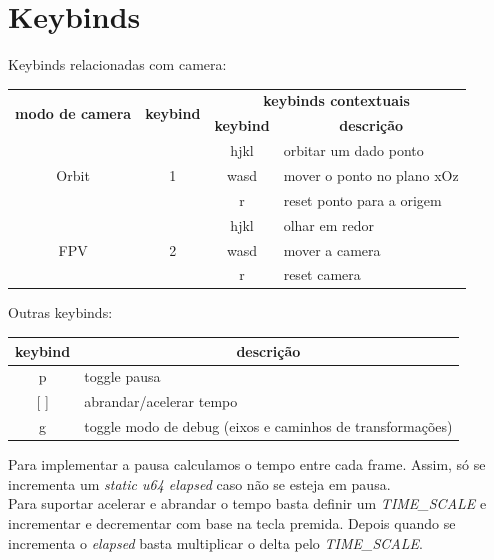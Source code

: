 \documentclass[a4paper]{report}
\begin{document}
\section{Keybinds}
Keybinds relacionadas com camera:
\begin{table}[H]
\begin{tabular}{|c|c|c|l|}
\hline
\multirow{2}{*}{\textbf{modo de camera}} & \multirow{2}{*}{\textbf{keybind}} & \multicolumn{2}{c|}{\textbf{keybinds contextuais}} \\ \cline{3-4} 
                       &                    & \textbf{keybind} & \multicolumn{1}{c|}{\textbf{descrição}} \\ \hline
\multirow{3}{*}{Orbit} & \multirow{3}{*}{1} & hjkl             & orbitar um dado ponto                   \\ \cline{3-4} 
                       &                    & wasd             & mover o ponto no plano xOz              \\ \cline{3-4} 
                       &                    & r                & reset ponto para a origem               \\ \hline
\multirow{3}{*}{FPV}   & \multirow{3}{*}{2} & hjkl             & olhar em redor                          \\ \cline{3-4} 
                       &                    & wasd             & mover a camera                          \\ \cline{3-4} 
                       &                    & r                & reset camera                            \\ \hline
\end{tabular}
\end{table}
Outras keybinds:

\begin{table}[H]
\begin{tabular}{|c|l|}
\hline
\textbf{keybind} & \multicolumn{1}{c|}{\textbf{descrição}}                   \\ \hline
p                & toggle pausa                                              \\ \hline
{[} {]}          & abrandar/acelerar tempo                                   \\ \hline
g                & toggle modo de debug (eixos e caminhos de transformações) \\ \hline
\end{tabular}
\end{table}

\pagebreak
Para implementar a pausa calculamos o tempo entre cada frame. Assim, só se
incrementa um \textit{static u64 elapsed} caso não se esteja em pausa.\\
Para suportar acelerar e abrandar o tempo basta definir um \textit{TIME\_SCALE}
e incrementar e decrementar com base na tecla premida. Depois quando se
incrementa o \textit{elapsed} basta multiplicar o delta pelo
\textit{TIME\_SCALE}.\\
\end{document}

